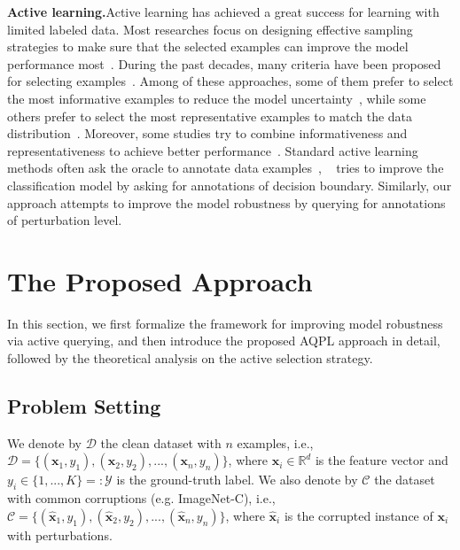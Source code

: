 \documentclass[letterpaper]{article} %
\begin{document}
\textbf{Active learning.}\quad Active learning has achieved a great success for learning with limited labeled data. Most researches focus on designing effective sampling strategies to make sure that the selected examples can improve the model performance most~\cite{fu2013survey}. During the past decades, many criteria have been proposed for selecting examples~\cite{fu2013survey,huang2010active,lewis1994sequential,seung1992query,you2014diverse,geman1992neural,roy2001toward}. Among of these approaches, some of them prefer to select the most informative examples to reduce the model uncertainty~\cite{lewis1994sequential,seung1992query,you2014diverse}, while some others prefer to select the most representative examples to match the data distribution~\cite{geman1992neural,roy2001toward}. Moreover, some studies try to combine informativeness and representativeness to achieve better performance~\cite{huang2013active,huang2010active}. Standard active learning methods often ask the oracle to annotate data examples~\cite{fu2013survey}, ~\cite{huijser2017active} tries to improve the classification model by asking for annotations of decision boundary. Similarly, our approach attempts to improve the model robustness by querying for annotations of perturbation level.


\section{The Proposed Approach}
In this section, we first formalize the framework for improving model robustness via active querying, and then introduce the proposed AQPL approach in detail, followed by the theoretical analysis on the active selection strategy.

\subsection{Problem Setting}
We denote by $\mathcal{D}$ the clean dataset with $n$ examples, i.e., $\mathcal{D}=\{(\mathbf{x}_1,y_1),(\mathbf{x}_2,y_2),...,(\mathbf{x}_n,y_n)\}$, where $\mathbf{x}_i \in \mathbb{R}^d$ is the feature vector and $y_i \in \{1,...,K\} =: \mathcal{Y}$ is the ground-truth label. We also denote by $\mathcal{C}$ the dataset with common corruptions (e.g. ImageNet-C), i.e., $\mathcal{C}=\{(\hat{\mathbf{x}}_1,y_1),(\hat{\mathbf{x}}_2,y_2),...,(\hat{\mathbf{x}}_n,y_n)\}$, where $\hat{\mathbf{x}}_i$ is the corrupted instance of $\mathbf{x}_i$ with perturbations.
\end{document}
